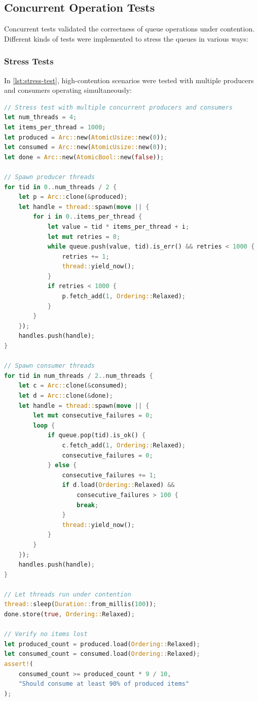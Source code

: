 \subsection{Concurrent Operation Tests}
Concurrent tests validated the correctness of queue operations under contention. Different kinds of tests were implemented to stress the queues in various ways:

\subsubsection{Stress Tests}
In \cref{lst:stress-test}, high-contention scenarios were tested with multiple producers and consumers operating simultaneously:

\begin{lstlisting}[language=Rust, style=boxed, caption={High-contention stress test}, label={lst:stress-test}]
// Stress test with multiple concurrent producers and consumers
let num_threads = 4;
let items_per_thread = 1000;
let produced = Arc::new(AtomicUsize::new(0));
let consumed = Arc::new(AtomicUsize::new(0));
let done = Arc::new(AtomicBool::new(false));

// Spawn producer threads
for tid in 0..num_threads / 2 {
    let p = Arc::clone(&produced);
    let handle = thread::spawn(move || {
        for i in 0..items_per_thread {
            let value = tid * items_per_thread + i;
            let mut retries = 0;
            while queue.push(value, tid).is_err() && retries < 1000 {
                retries += 1;
                thread::yield_now();
            }
            if retries < 1000 {
                p.fetch_add(1, Ordering::Relaxed);
            }
        }
    });
    handles.push(handle);
}

// Spawn consumer threads
for tid in num_threads / 2..num_threads {
    let c = Arc::clone(&consumed);
    let d = Arc::clone(&done);
    let handle = thread::spawn(move || {
        let mut consecutive_failures = 0;
        loop {
            if queue.pop(tid).is_ok() {
                c.fetch_add(1, Ordering::Relaxed);
                consecutive_failures = 0;
            } else {
                consecutive_failures += 1;
                if d.load(Ordering::Relaxed) && 
                    consecutive_failures > 100 {
                    break;
                }
                thread::yield_now();
            }
        }
    });
    handles.push(handle);
}

// Let threads run under contention
thread::sleep(Duration::from_millis(100));
done.store(true, Ordering::Relaxed);

// Verify no items lost
let produced_count = produced.load(Ordering::Relaxed);
let consumed_count = consumed.load(Ordering::Relaxed);
assert!(
    consumed_count >= produced_count * 9 / 10,
    "Should consume at least 90% of produced items"
);
\end{lstlisting}

